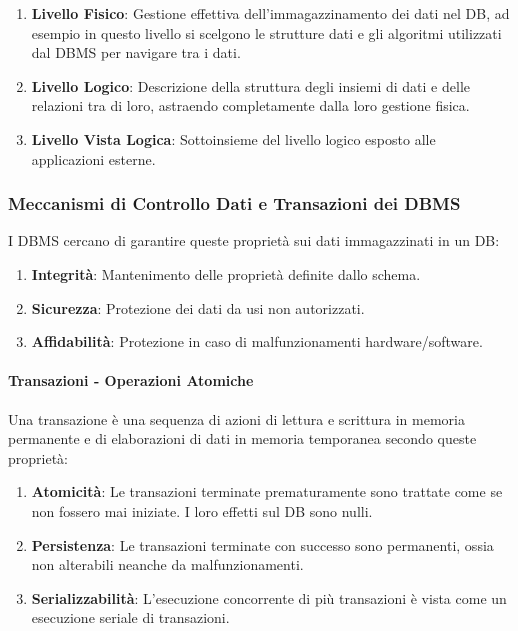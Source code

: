 \documentclass{article}
\begin{document}
\begin{enumerate}
    \item \textbf{Livello Fisico}: Gestione effettiva dell'immagazzinamento dei dati nel DB, ad esempio in questo livello si scelgono le strutture dati e gli algoritmi
    utilizzati dal DBMS per navigare tra i dati.
    \item \textbf{Livello Logico}: Descrizione della struttura degli insiemi di dati e delle relazioni tra di loro, astraendo completamente dalla loro gestione fisica.
    \item \textbf{Livello Vista Logica}: Sottoinsieme del livello logico esposto alle applicazioni esterne.
\end{enumerate}

\subsubsection{Meccanismi di Controllo Dati e Transazioni dei DBMS}

I DBMS cercano di garantire queste proprietà sui dati immagazzinati in un DB:

\begin{enumerate}
    \item \textbf{Integrità}: Mantenimento delle proprietà definite dallo schema.
    \item \textbf{Sicurezza}: Protezione dei dati da usi non autorizzati.
    \item \textbf{Affidabilità}: Protezione in caso di malfunzionamenti hardware/software.
\end{enumerate}

\paragraph{Transazioni - Operazioni Atomiche} Una transazione è una sequenza di azioni di lettura e scrittura in memoria permanente e di elaborazioni di dati in memoria
temporanea secondo queste proprietà:

\begin{enumerate}
    \item \textbf{Atomicità}: Le transazioni terminate prematuramente sono trattate come se non fossero mai iniziate. I loro effetti sul DB sono nulli.
    \item \textbf{Persistenza}: Le transazioni terminate con successo sono permanenti, ossia non alterabili neanche da malfunzionamenti.
    \item \textbf{Serializzabilità}: L'esecuzione concorrente di più transazioni è vista come un esecuzione seriale di transazioni.
\end{enumerate}
\end{document}
